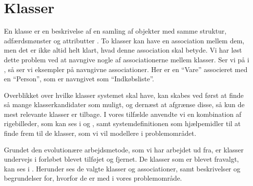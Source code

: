 \section{Klasser}
\label{sec:klasser}

En klasse er en beskrivelse af en samling af objekter med samme struktur, adfærdsmønster og attributter \cite[s. ~51]{ooad}. To klasser kan have en association mellem dem, men det er ikke altid helt klart, hvad denne association skal betyde. Vi har løst dette problem ved at navngive nogle af associationerne mellem klasser. Ser vi på  i , så ser vi eksempler på navngivne associationer. Her er en ``Vare'' associeret med en ``Person'', som er navngivet som ``Indkøbsliste''. 

Overblikket over hvilke klasser systemet skal have, kan skabes ved først at finde så mange klasserkandidater som muligt, og dernæst at afgrænse disse, så kun de mest relevante klasser er tilbage. I vores tilfælde anvendte vi en kombination af rigebilleder, som kan ses i  og , samt systemdefinitionen som hjælpemidler til at finde frem til de klasser, som vi vil modellere i problemområdet.

Grundet den evolutionære arbejdsmetode, som vi har arbejdet ud fra, er klasser undervejs i forløbet blevet tilføjet og fjernet. De klasser som er blevet fravalgt, kan ses i . Herunder ses de valgte klasser og associationer, samt beskrivelser og begrundelser for, hvorfor de er med i vores problemområde.


